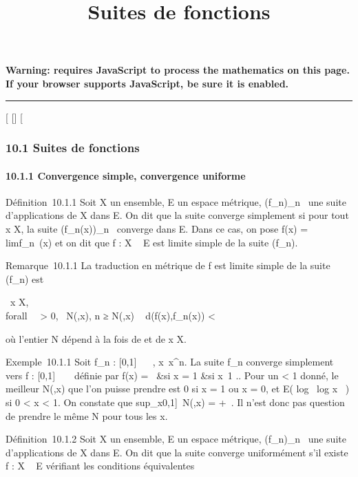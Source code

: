 \documentclass[]{article}
\title{Suites de fonctions}
\author{}
\date{}
\begin{document}
\maketitle

\textbf{Warning: 
requires JavaScript to process the mathematics on this page.\\ If your
browser supports JavaScript, be sure it is enabled.}

\begin{center}\rule{3in}{0.4pt}\end{center}

{[}
{[}{]}
{[}

\subsubsection{10.1 Suites de fonctions}

\paragraph{10.1.1 Convergence simple, convergence uniforme}

Définition~10.1.1 Soit X un ensemble, E un espace métrique,
(f\_n)\_n\in{}~ une suite d'applications de X dans E. On dit
que la suite converge simplement si pour tout x \in X, la suite
(f\_n(x))\_n\in{}~ converge dans E. Dans ce cas, on pose
f(x) = limf\_n~(x) et on dit que f : X
\rightarrow~ E est limite simple de la suite (f\_n).

Remarque~10.1.1 La traduction en métrique de f est limite simple de la
suite (f\_n) est

\forall~x \in X, \\forall~~\epsilon
\textgreater{} 0, \exists~N(\epsilon,x),\quad
n ≥ N(\epsilon,x) \rigtharrow~ d(f(x),f\_n(x)) \textless{} \epsilon

où l'entier N dépend à la fois de \epsilon et de x \in X.

Exemple~10.1.1 Soit f\_n : {[}0,1{]} \rightarrow~ ~,
x\mapsto~x^n. La suite f\_n
converge simplement vers f : {[}0,1{]} \rightarrow~ ~ définie par f(x) =
\left \ &si x
= 1 &si x\neq~1 
\right .. Pour un \epsilon \textless{} 1 donné, le meilleur
N(\epsilon,x) que l'on puisse prendre est 0 si x = 1 ou x = 0, et E(
log~ \epsilon \over
log x~ ) si 0 \textless{} x \textless{} 1. On
constate que sup\_x\in{[}0,1{]}~N(\epsilon,x) =
+\infty~. Il n'est donc pas question de prendre le même N pour tous les x.

Définition~10.1.2 Soit X un ensemble, E un espace métrique,
(f\_n)\_n\in{}~ une suite d'applications de X dans E. On dit
que la suite converge uniformément s'il existe f : X \rightarrow~ E vérifiant les
conditions équivalentes
\end{document}
